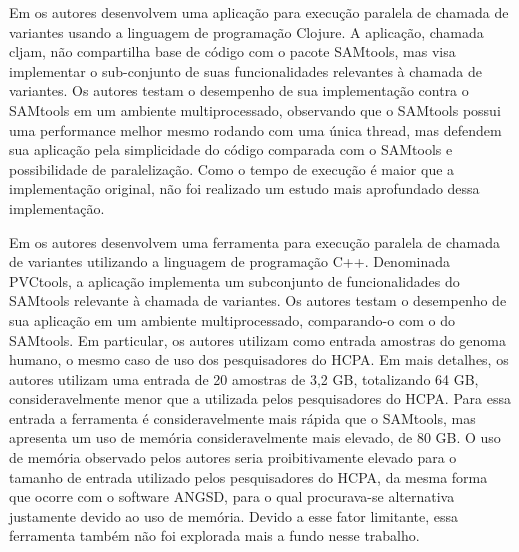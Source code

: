 \documentclass[cic,tc]{iiufrgs}
\begin{document}
Em \cite{takeuchi2016cljam} os autores desenvolvem uma aplicação para execução
paralela de chamada de variantes usando a linguagem de programação Clojure. A
aplicação, chamada cljam, não compartilha base de código com o pacote SAMtools,
mas visa implementar o sub-conjunto de suas funcionalidades relevantes à
chamada de variantes. Os autores testam o desempenho de sua implementação
contra o SAMtools em um ambiente multiprocessado, observando que o SAMtools
possui uma performance melhor mesmo rodando com uma única thread, mas defendem
sua aplicação pela simplicidade do código comparada com o SAMtools e
possibilidade de paralelização. Como o tempo de execução é maior que a
implementação original, não foi realizado um estudo mais aprofundado dessa
implementação.

Em \cite{jin2019pvctools} os autores desenvolvem uma ferramenta para execução
paralela de chamada de variantes utilizando a linguagem de programação C++.
Denominada PVCtools, a aplicação implementa um subconjunto de funcionalidades
do SAMtools relevante à chamada de variantes. Os autores testam o desempenho de
sua aplicação em um ambiente multiprocessado, comparando-o com o do SAMtools.
Em particular, os autores utilizam como entrada amostras do genoma humano,
o mesmo caso de uso dos pesquisadores do HCPA. Em mais detalhes, os
autores utilizam uma entrada de 20 amostras de 3,2 GB, totalizando 64 GB,
consideravelmente menor que a utilizada pelos pesquisadores do HCPA. Para essa
entrada a ferramenta é consideravelmente mais rápida que o SAMtools, mas
apresenta um uso de memória consideravelmente mais elevado, de 80 GB. O uso de
memória observado pelos autores seria proibitivamente elevado para o tamanho de
entrada utilizado pelos pesquisadores do HCPA, da mesma forma que ocorre com o
software ANGSD, para o qual procurava-se alternativa justamente devido ao uso
de memória. Devido a esse fator limitante, essa ferramenta também não foi
explorada mais a fundo nesse trabalho.
\end{document}
